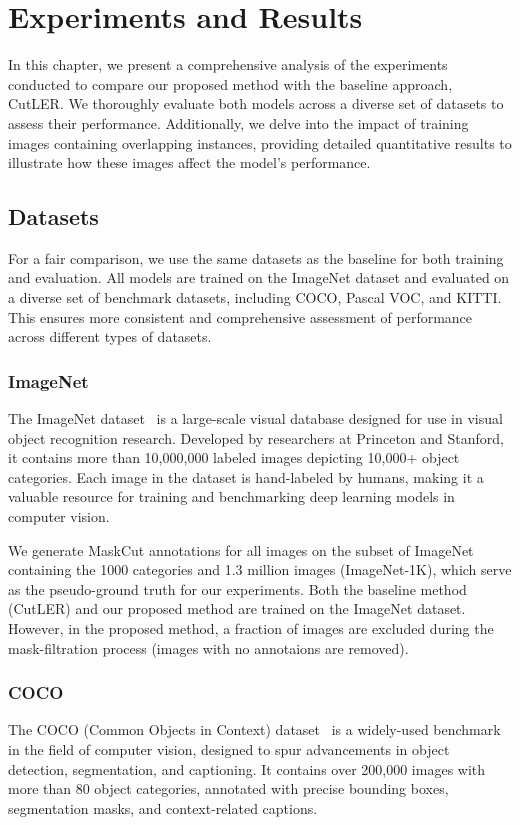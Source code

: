 \chapter{Experiments and Results}\label{chap:experiments}
In this chapter, we present a comprehensive analysis of the experiments conducted to compare our proposed method with the baseline approach, CutLER. We thoroughly evaluate both models across a diverse set of datasets to assess their performance. Additionally, we delve into the impact of training images containing overlapping instances, providing detailed quantitative results to illustrate how these images affect the model's performance. 

\section{Datasets}
For a fair comparison, we use the same datasets as the baseline for both training and evaluation. All models are trained on the ImageNet dataset and evaluated on a diverse set of benchmark datasets, including COCO, Pascal VOC, and KITTI. This ensures more consistent and comprehensive assessment of performance across different types of datasets.

\subsection{ImageNet}
The ImageNet dataset~\cite{deng2009imagenet} is a large-scale visual database designed for use in visual object recognition research. Developed by researchers at Princeton and Stanford, it contains more than 10,000,000 labeled images depicting 10,000+ object categories. Each image in the dataset is hand-labeled by humans, making it a valuable resource for training and benchmarking deep learning models in computer vision.

We generate MaskCut annotations for all images on the subset of ImageNet containing the 1000 categories and 1.3 million images (ImageNet-1K), which serve as the pseudo-ground truth for our experiments. Both the baseline method (CutLER) and our proposed method are trained on the ImageNet dataset. However, in the proposed method, a fraction of images are excluded during the mask-filtration process (images with no annotaions are removed).

\subsection{COCO}
The COCO (Common Objects in Context) dataset~\cite{lin2015microsoftcococommonobjects} is a widely-used benchmark in the field of computer vision, designed to spur advancements in object detection, segmentation, and captioning. It contains over 200,000 images with more than 80 object categories, annotated with precise bounding boxes, segmentation masks, and context-related captions. 

